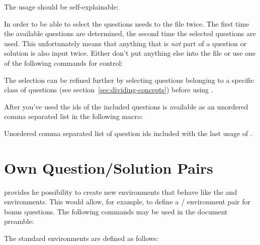 \documentclass[DIV10,toc=index,toc=bib,numbers=noendperiod]{cnpkgdoc}
\begin{document}
The usage should be self-explainable:
\begin{beispiel}
\end{beispiel}
In order to be able to select the questions \ExSheets needs to  the
file twice.  The first time the available questions are determined, the second
time the selected questions are used.  This unfortunately means that anything
that is \emph{not} part of a question or solution is also input twice.  Either
don't put anything else into the file or use one of the following commands for
control:
\begin{beschreibung}
\end{beschreibung}

The selection can be refined further by selecting questions belonging to a
specific class of questions (see section~\ref{sec:dividing-concepts}) before
using .

After you've used  the \acp{id} of the
included questions is available as an unordered comma separated list in the
following macro:
\begin{beschreibung}
  \newline
    Unordered comma separated list of question \acp{id} included with the last
    usage of .
\end{beschreibung}

\section{Own Question/Solution Pairs}
\noindent{}\ExSheets provides he possibility to create new
environments that behave like the  and 
environments.  This would allow, for example, to define a
/ environment pair for bonus questions.  The
following commands may be used in the document preamble:
\begin{beschreibung}
\end{beschreibung}
The standard environments are defined as follows:
\begin{beispiel}
\end{beispiel}
\end{document}
